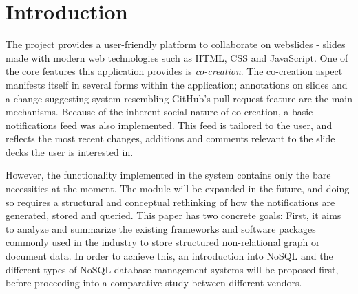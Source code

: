 \documentclass[fleqn,10pt]{voorstel}
\affiliation{\textbf{Contact:} \href{mailto:florian@floriandejonckheere.be}{florian@floriandejonckheere.be}}
\begin{document}
\flushbottom %
\maketitle %
\tableofcontents %
\thispagestyle{empty} %



\section{Introduction} %
\label{sec:introduction}


The \textcite{OpenWebslides} project provides a user-friendly platform to collaborate on webslides - slides made with modern web technologies such as HTML, CSS and JavaScript. One of the core features this application provides is \emph{co-creation}. The co-creation aspect manifests itself in several forms within the application; annotations on slides and a change suggesting system resembling GitHub's pull request feature are the main mechanisms. Because of the inherent social nature of co-creation, a basic notifications feed was also implemented. This feed is tailored to the user, and reflects the most recent changes, additions and comments relevant to the slide decks the user is interested in.

However, the functionality implemented in the system contains only the bare necessities at the moment. The module will be expanded in the future, and doing so requires a structural and conceptual rethinking of how the notifications are generated, stored and queried. This paper has two concrete goals: First, it aims to analyze and summarize the existing frameworks and software packages commonly used in the industry to store structured non-relational graph or document data. In order to achieve this, an introduction into NoSQL and the different types of NoSQL database management systems will be proposed first, before proceeding into a comparative study between different vendors.
\end{document}
